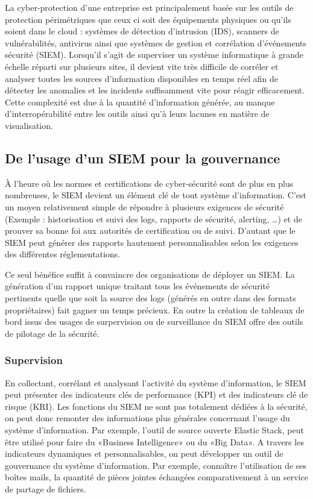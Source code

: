 
La cyber-protection d'une entreprise est principalement basée sur les outils de protection périmétriques que ceux ci soit des équipements physiques ou qu'ils soient dans le cloud : systèmes de détection d’intrusion (IDS), scanners de vulnérabilités, antivirus ainsi que systèmes de gestion et corrélation d’événements sécurité (SIEM). Lorsqu’il s’agit de superviser un système informatique à grande échelle réparti sur plusieurs sites, il devient vite très difficile de corréler et analyser toutes les sources d’information disponibles en temps réel afin de détecter les anomalies et les incidents suffisamment vite pour réagir efficacement. Cette complexité est due à la quantité d’information générée, au manque d’interropérabilité entre les outils ainsi qu’à leurs lacunes en matière de visualisation.


\subsection {De l'usage d'un SIEM pour la gouvernance}  

À l’heure où les normes et certifications de cyber-sécurité sont de plus en plus nombreuses, le SIEM devient un élément clé de tout système d’information. C’est un moyen relativement simple de répondre à plusieurs exigences de sécurité (Exemple : historisation et suivi des logs, rapports de sécurité, alerting, …) et de prouver sa bonne foi aux autorités de certification ou de suivi. D’autant que le SIEM peut générer des rapports hautement personnalisables selon les exigences des différentes réglementations. 

Ce seul bénéfice suffit à convaincre des organisations de déployer un SIEM. La génération d’un rapport unique traitant tous les événements de sécurité pertinents quelle que soit la source des logs (générés en outre dans des formats propriétaires) fait gagner un temps précieux. En outre la création de tableaux de bord issus des usages de surpervision ou de surveillance du SIEM offre des outils de pilotage de la sécurité. 

\subsubsection{Supervision}
En collectant, corrélant et analysant l’activité du système d’information, le SIEM peut présenter des indicateurs clés de performance (KPI) et des indicateurs clé de risque (KRI).
Les fonctions du SIEM ne sont pas totalement dédiées à la sécurité, on peut donc remonter des informations plus générales concernant l’usage du système d’information. Par exemple, l’outil de source ouverte Elastic Stack, peut être utilisé pour faire du «Business Intelligence» ou du «Big Data». A travers les indicateurs dynamiques et personnalisables, on peut développer un outil de gouvernance du système d’information. Par exemple, connaître l’utilisation de ses boîtes mails, la quantité de pièces jointes échangées comparativement à un service de partage de fichiers.

